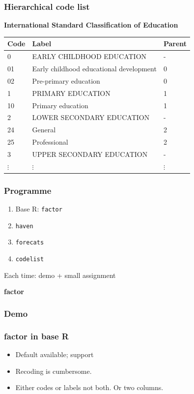 \documentclass[aspectratio=1610]{beamer}
\begin{document}
\begin{frame}
  \frametitle{Hierarchical code list}
  \begin{center}
  \textbf{International Standard Classification of Education}
  \begin{tabular}{lll}
    \toprule
    Code & Label & Parent\\
    \midrule
    0  &EARLY CHILDHOOD EDUCATION & -\\
    01 &Early childhood educational development & 0\\
    02 &Pre-primary education & 0\\
    1  &PRIMARY EDUCATION & 1\\
    10 &Primary education & 1\\
    2  &LOWER SECONDARY EDUCATION & -\\
    24 &General & 2\\
    25 &Professional & 2\\
    3  &UPPER SECONDARY EDUCATION & -\\
    $\vdots$ &$\vdots$ & $\vdots$\\
    \bottomrule
  \end{tabular}
  \end{center}
\end{frame}

\invert
\begin{frame}
  \frametitle{Programme}
  \begin{enumerate}
    \item Base R: \texttt{factor}
    \item \texttt{haven}
    \item \texttt{forecats}
    \item \texttt{codelist}
  \end{enumerate}
  Each time: demo + small assignment
\end{frame}

\begin{frame}
   \LARGE \textbf{factor}
   \par
\end{frame}
\revert

\begin{frame}
  \frametitle{Demo}
\end{frame}

\begin{frame}
  \frametitle{factor in base R}
  \begin{itemize}
    \item[+] Default available; support
    \item[-] Recoding is cumbersome.
    \item[-] Either codes or labels not both. Or two columns.
  \end{itemize}
\end{frame}
\end{document}
